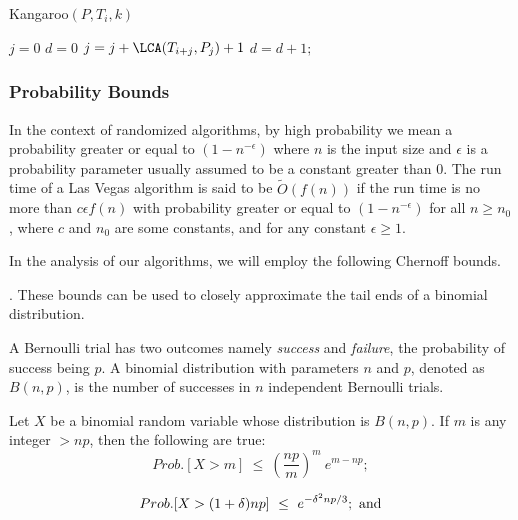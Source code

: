 \begin{algorithm}
\caption{Kangaroo$(P, T_i, k)$}\label{alg_kangaroo}
$j=0$\;
$d=0$\;
 {
  $j = j + \LCA(T_{i+j}, P_j)+1$\;
   {
     \Return{\True}\;
  }
  $d=d+1;$
}  
\Return{\False}\;
\end{algorithm}

\subsubsection{Probability Bounds}
 
In the context of randomized algorithms, by
high probability we mean a probability greater or equal to $(1-n^{-\epsilon})$ 
where $n$ is the input size and $\epsilon$ is a probability parameter usually
assumed to be a constant greater than $0$. The run time of a Las Vegas algorithm
is said to be $\widetilde O(f(n))$ if the run time is no more than $c\epsilon f(n)$
with probability greater or equal to $(1-n^{-\epsilon})$ for all $n\geq n_0$,
where $c$ and $n_0$ are some constants, and for any constant $\epsilon\geq 1$.


In the analysis of our algorithms, we will employ the following Chernoff bounds.


 \cite{Che52}.
These bounds can be used to closely
approximate the tail ends of a binomial distribution.

A Bernoulli trial has two outcomes namely {\em success} and {\em failure},
the probability of success being $p$. A binomial distribution with
parameters $n$ and $p$, denoted as $B(n,p)$, is the number of successes
in $n$ independent Bernoulli trials.

Let $X$ be a binomial random variable whose distribution is
$B(n,p)$. If $m$ is any integer $>np$, then the following are true:
\begin{equation}\label{eq_chernoff1}
Prob.[X>m]~\leq~\left (\frac{np}{m}\right )^m~e^{m-np};
\end{equation}

\begin{equation}\label{eq_chernoff2}
Prob.[X>(1+\delta)np]~\leq~e^{-\delta^2np/3};~{\rm and}
\end{equation}

